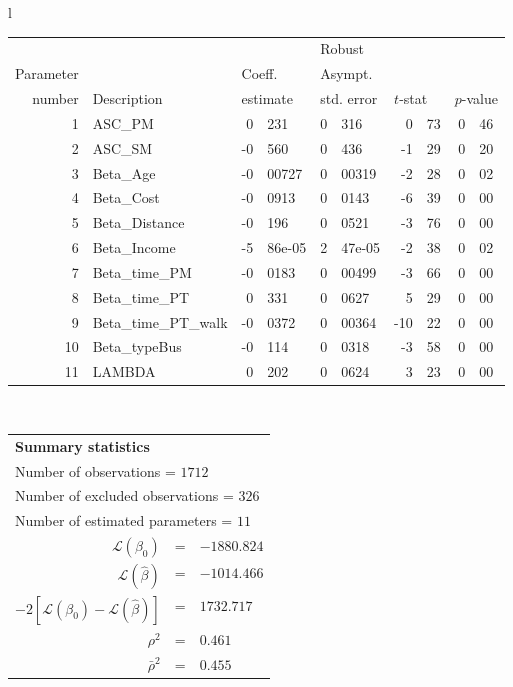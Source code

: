   \begin{tabular}{l}
\begin{tabular}{rlr@{.}lr@{.}lr@{.}lr@{.}l}
         &                       &   \multicolumn{2}{l}{}    & \multicolumn{2}{l}{Robust}  &     \multicolumn{4}{l}{}   \\
Parameter &                       &   \multicolumn{2}{l}{Coeff.}      & \multicolumn{2}{l}{Asympt.}  &     \multicolumn{4}{l}{}   \\
number &  Description                     &   \multicolumn{2}{l}{estimate}      & \multicolumn{2}{l}{std. error}  &   \multicolumn{2}{l}{$t$-stat}  &   \multicolumn{2}{l}{$p$-value}   \\

\hline

1 & ASC_PM  & 0&231 & 0&316 & 0&73 & 0&46\\
2 & ASC_SM & -0&560 & 0&436 & -1&29 & 0&20\\
3 & Beta_Age & -0&00727 & 0&00319 & -2&28 & 0&02\\
4 & Beta_Cost & -0&0913 & 0&0143 & -6&39 & 0&00\\
5 & Beta_Distance & -0&196 & 0&0521 & -3&76 & 0&00\\
6 & Beta_Income & -5&86e-05 & 2&47e-05 & -2&38 & 0&02\\
7 & Beta_time_PM & -0&0183 & 0&00499 & -3&66 & 0&00\\
8 & Beta_time_PT & 0&331 & 0&0627 & 5&29 & 0&00\\
9 & Beta_time_PT_walk & -0&0372 & 0&00364 & -10&22 & 0&00\\
10 & Beta_typeBus & -0&114 & 0&0318 & -3&58 & 0&00\\
11 & LAMBDA & 0&202 & 0&0624 & 3&23 & 0&00\\
\hline
\end{tabular}
\\
\begin{tabular}{rcl}
\multicolumn{3}{l}{\bf Summary statistics}\\
\multicolumn{3}{l}{ Number of observations = $1712$} \\
\multicolumn{3}{l}{ Number of excluded observations = $326$} \\
\multicolumn{3}{l}{ Number of estimated  parameters = $11$} \\
 $\mathcal{L}(\beta_0)$ &=&  $-1880.824$ \\
 $\mathcal{L}(\hat{\beta})$ &=& $-1014.466 $  \\
 $-2[\mathcal{L}(\beta_0) -\mathcal{L}(\hat{\beta})]$ &=& $1732.717$ \\
    $\rho^2$ &=&   $0.461$ \\
    $\bar{\rho}^2$ &=&    $0.455$ \\
\end{tabular}
  \end{tabular}
